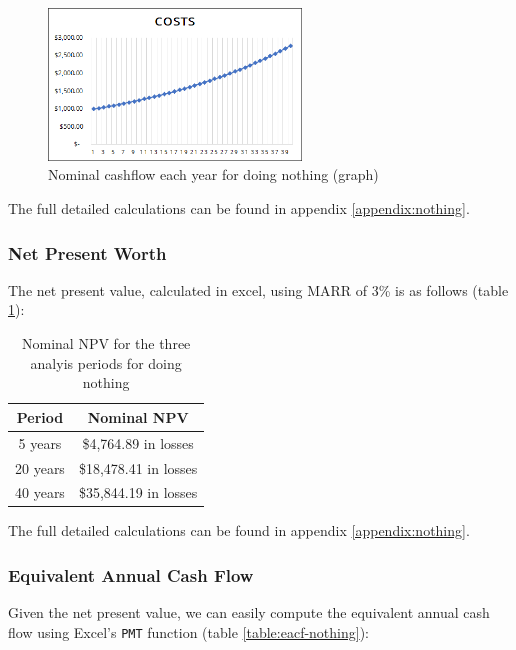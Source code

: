 \documentclass[10pt,letterpaper]{article}
\begin{document}
\begin{figure}[H]
	\centering
	\includegraphics[width=0.6\textwidth]{assets/1534568012402}
	\caption{Nominal cashflow each year for doing nothing (graph)}
	\label{fig:cf-nothing}
\end{figure}

The full detailed calculations can be found in appendix \ref{appendix:nothing}.\\

\subsubsection{Net Present Worth}

The net present value, calculated in excel, using MARR of 3\% is as follows (table \ref{table:npv-nothing}):

\begin{table}[H]
	\centering
	\begin{tabular}{|c|c|}
		\hline
		Period&Nominal NPV\\
		\hline
		5 years&\$4,764.89 in losses\\
 		20 years&\$18,478.41 in losses\\
		40 years&\$35,844.19 in losses\\
		\hline
	\end{tabular}
	\caption{Nominal NPV for the three analyis periods for doing nothing}
	\label{table:npv-nothing}
\end{table}

The full detailed calculations can be found in appendix \ref{appendix:nothing}.\\

\subsubsection{Equivalent Annual Cash Flow}

Given the net present value, we can easily compute the equivalent annual cash flow using Excel's \texttt{PMT} function (table \ref{table:eacf-nothing}):
\end{document}
